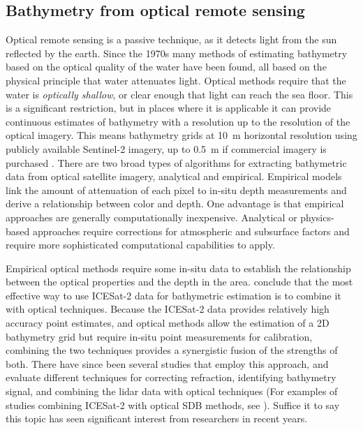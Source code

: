 \subsection{Bathymetry from optical remote sensing}
Optical remote sensing is a passive technique, as it detects light from the sun reflected by the earth. Since the 1970s many methods of estimating bathymetry based on the optical quality of the water have been found, all based on the physical principle that water attenuates light. Optical methods require that the water is \emph{optically shallow}, or clear enough that light can reach the sea floor. This is a significant restriction, but in places where it is applicable it can provide continuous estimates of bathymetry with a resolution up to the resolution of the optical imagery. This means bathymetry grids at 10~m horizontal resolution using publicly available Sentinel-2 imagery, up to 0.5~m if commercial imagery is purchased \parencite{Babbel2021a,LeQuilleuc2022b,Pike2019}. There are two broad types of algorithms for extracting bathymetric data from optical satellite imagery, analytical and empirical. Empirical models link the amount of attenuation of each pixel to in-situ depth measurements and derive a relationship between color and depth. One advantage is that empirical approaches are generally computationally inexpensive. Analytical or physics-based approaches require corrections for atmospheric and subsurface factors \parencite{Turner2021} and require more sophisticated computational capabilities to apply.

Empirical optical methods require some in-situ data to establish the relationship between the optical properties and the depth in the area. \cite{Parrish2019} conclude that the most effective way to use ICESat-2 data for bathymetric estimation is to combine it with optical techniques. Because the ICESat-2 data provides relatively high accuracy point estimates, and optical methods allow the estimation of a 2D bathymetry grid but require in-situ point measurements for calibration, combining the two techniques provides a synergistic fusion of the strengths of both. There have since been several studies that employ this approach, and evaluate different techniques for correcting refraction, identifying bathymetry signal, and combining the lidar data with optical techniques (For examples of studies combining ICESat-2 with optical SDB methods, see \cite{Geyman2019,Pike2019,Ma2020,Lee2021,Albright2021,Ranndal2021,Gleason2021,Thomas2021d,Babbel2021a,Hsu2021,Cao2021,Xie2021,Surisetty2022,Zhong2022a,Zheng2022,Daly2022,Xu2022,Magruder2020,Thomas2022,LeQuilleuc2022b}). Suffice it to say this topic has seen significant interest from researchers in recent years.

